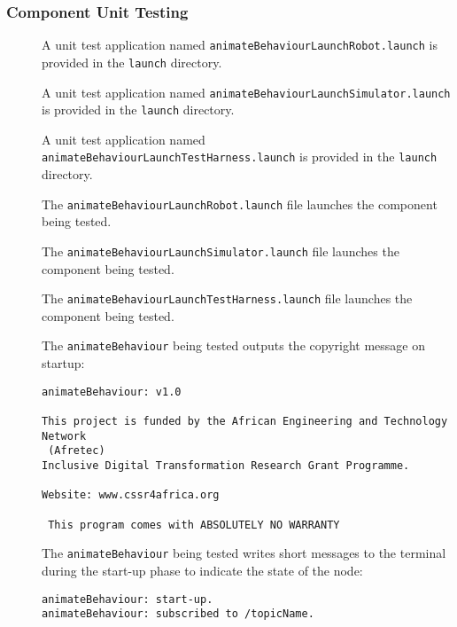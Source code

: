 \documentclass{CSSRforAfrica}
\newcommand{\checkboxChecked}{\fbox{\ding{51}}} %
\newcommand{\checkboxDashed}{\fbox{--}}         %
\begin{document}
\subsubsection{Component Unit Testing}
\label{subsubsection:animate_behaviour_unit_testing}

\begin{description}
\item[\checkboxDashed] A unit test application named {\small \verb+animateBehaviourLaunchRobot.launch+} is provided in the {\small \verb+launch+} directory. 

\item[\checkboxDashed] A unit test application named {\small \verb+animateBehaviourLaunchSimulator.launch+} is provided in the {\small \verb+launch+} directory. 

\item[\checkboxDashed] A unit test application named {\small \verb+animateBehaviourLaunchTestHarness.launch+} is provided in the {\small \verb+launch+} directory. 

\item[\checkboxDashed] The {\small \verb+animateBehaviourLaunchRobot.launch+} file  launches the component being tested.

\item[\checkboxDashed] The {\small \verb+animateBehaviourLaunchSimulator.launch+} file  launches the component being tested.

\item[\checkboxDashed] The {\small \verb+animateBehaviourLaunchTestHarness.launch+} file  launches the component being tested.

\item[\checkboxChecked]  The {\small \verb+animateBehaviour+} being tested outputs the copyright message on startup:
\begin{verbatim}
animateBehaviour: v1.0
 
This project is funded by the African Engineering and Technology Network 
 (Afretec) 
Inclusive Digital Transformation Research Grant Programme.
 
Website: www.cssr4africa.org
 
 This program comes with ABSOLUTELY NO WARRANTY
\end{verbatim}

\item[\checkboxChecked]  The {\small \verb+animateBehaviour+} being tested writes short messages to the terminal during the start-up phase to
 indicate the state of the node:
\begin{verbatim}
animateBehaviour: start-up.
animateBehaviour: subscribed to /topicName.
\end{verbatim}


\end{description}
\end{document}
